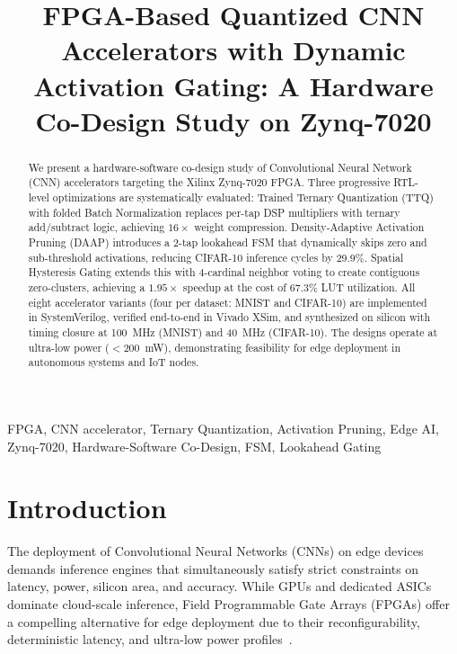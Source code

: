 \documentclass[conference]{IEEEtran}
\begin{document}
\title{FPGA-Based Quantized CNN Accelerators with Dynamic Activation Gating: A Hardware Co-Design Study on Zynq-7020}

\author{
}

\maketitle

\begin{abstract}
We present a hardware-software co-design study of Convolutional Neural Network (CNN) accelerators targeting the Xilinx Zynq-7020 FPGA. Three progressive RTL-level optimizations are systematically evaluated: Trained Ternary Quantization (TTQ) with folded Batch Normalization replaces per-tap DSP multipliers with ternary add/subtract logic, achieving $16\times$ weight compression. Density-Adaptive Activation Pruning (DAAP) introduces a 2-tap lookahead FSM that dynamically skips zero and sub-threshold activations, reducing CIFAR-10 inference cycles by 29.9\%. Spatial Hysteresis Gating extends this with 4-cardinal neighbor voting to create contiguous zero-clusters, achieving a $1.95\times$ speedup at the cost of 67.3\% LUT utilization. All eight accelerator variants (four per dataset: MNIST and CIFAR-10) are implemented in SystemVerilog, verified end-to-end in Vivado XSim, and synthesized on silicon with timing closure at 100~MHz (MNIST) and 40~MHz (CIFAR-10). The designs operate at ultra-low power ($<$200~mW), demonstrating feasibility for edge deployment in autonomous systems and IoT nodes.
\end{abstract}

\begin{IEEEkeywords}
FPGA, CNN accelerator, Ternary Quantization, Activation Pruning, Edge AI, Zynq-7020, Hardware-Software Co-Design, FSM, Lookahead Gating
\end{IEEEkeywords}


\section{Introduction}
\label{sec:introduction}

The deployment of Convolutional Neural Networks (CNNs) on edge devices demands inference engines that simultaneously satisfy strict constraints on latency, power, silicon area, and accuracy. While GPUs and dedicated ASICs dominate cloud-scale inference, Field Programmable Gate Arrays (FPGAs) offer a compelling alternative for edge deployment due to their reconfigurability, deterministic latency, and ultra-low power profiles~\cite{guo2019}.
\end{document}

